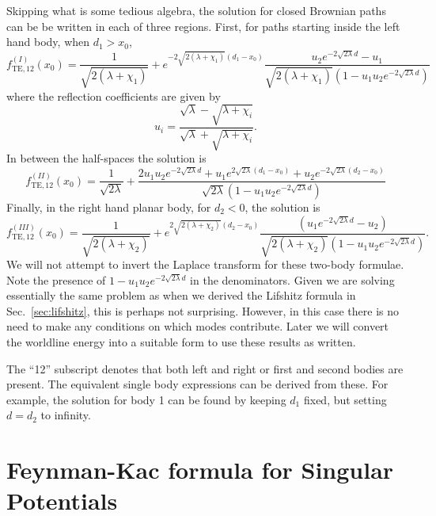 Skipping what is some tedious algebra, the solution for closed Brownian paths can be be written 
in each of three regions.  First, for paths starting inside the left hand body, when $d_1>x_0$, 
\begin{equation}
  f_{\text{TE},12}^{(I)}(x_0)= \dfrac{1}{\sqrt{2(\lambda+\chi_1)}} 
  + e^{-2\sqrt{2(\lambda+\chi_1)}(d_1-x_0)}\dfrac{u_2 e^{-2\sqrt{2\lambda}d} - u_1}
  {\sqrt{2(\lambda+\chi_1)}(1-u_1u_2 e^{-2\sqrt{2\lambda}d})}
\end{equation}
where the reflection coefficients are given by
\begin{equation}
  u_i = \frac{\sqrt{\lambda} -\sqrt{\lambda+\chi_i}}{\sqrt{\lambda} + \sqrt{\lambda+\chi_i}}.
\end{equation}
In between the half-spaces the solution is 
\begin{equation}
  f^{(II)}_{\text{TE},12}(x_0)=\frac{1}{\sqrt{2\lambda}} 
  + \dfrac{2u_1u_2 e^{-2\sqrt{2\lambda}d} + u_1 e^{2\sqrt{2\lambda}(d_1-x_0)} 
    +u_2 e^{-2\sqrt{2\lambda}(d_2-x_0)}}{\sqrt{2\lambda}(1-u_1u_2 e^{-2\sqrt{2\lambda}d})}
\end{equation}
Finally, in the right hand planar body, for $d_2<0$, the solution is 
\begin{equation}
  f^{(III)}_{\text{TE},12}(x_0) = 
  \dfrac{1}{\sqrt{2(\lambda+\chi_2)}} 
  + e^{2\sqrt{2(\lambda+\chi_2)}(d_2-x_0)}\dfrac{(u_1 e^{-2\sqrt{2\lambda}d}-u_2)}
  {\sqrt{2(\lambda+\chi_2)}(1-u_1u_2 e^{-2\sqrt{2\lambda}d})}.
\end{equation}
We will not attempt to invert the Laplace transform for these two-body formulae.  
Note the presence of $1-u_1u_2e^{-2\sqrt{2\lambda}d}$ in the denominators.  Given we are solving essentially the same
problem as when we derived the Lifshitz formula in Sec.~\ref{sec:lifshitz}, this is perhaps not surprising. 
However, in this case there is no need to make any conditions on which modes contribute.  
Later we will convert the worldline energy into a suitable form to use these results as written.  

The ``12'' subscript denotes that both left and right or first and second bodies are present.
The equivalent single body expressions can be derived from these.  For example, the solution for body 1 can
be found by keeping $d_1$ fixed, but setting $d=d_2$ to infinity.  

\section{Feynman-Kac formula for Singular Potentials}

